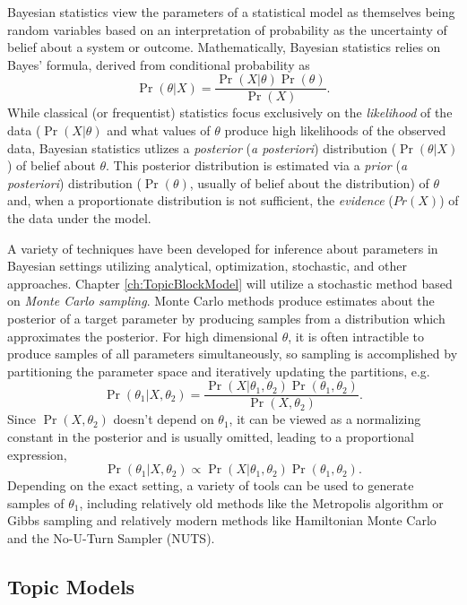         Bayesian statistics view the parameters of a statistical model as themselves being random variables based on an interpretation of probability as the uncertainty of belief about a system or outcome.  Mathematically, Bayesian statistics relies on Bayes' formula, derived from conditional probability as
        $$ \Pr(\theta | X) = \frac{\Pr(X | \theta) \Pr(\theta)}{\Pr(X)}. $$
        While classical (or frequentist) statistics focus exclusively on the \emph{likelihood} of the data ($\Pr(X | \theta)$ and what values of $\theta$ produce high likelihoods of the observed data, Bayesian statistics utlizes a \emph{posterior} (\emph{a posteriori}) distribution ($\Pr(\theta | X)$) of belief about $\theta$.  This posterior distribution is estimated via a \emph{prior} (\emph{a posteriori}) distribution ($\Pr(\theta)$, usually of belief about the distribution) of $\theta$ and, when a proportionate distribution is not sufficient, the \emph{evidence} ($Pr(X)$) of the data under the model.
        
        A variety of techniques have been developed for inference about parameters in Bayesian settings utilizing analytical, optimization, stochastic, and other approaches.  Chapter \ref{ch:TopicBlockModel} will utilize a stochastic method based on \emph{Monte Carlo sampling}.  Monte Carlo methods produce estimates about the posterior of a target parameter by producing samples from a distribution which approximates the posterior.  For high dimensional $\theta$, it is often intractible to produce samples of all parameters simultaneously, so sampling is accomplished by partitioning the parameter space and iteratively updating the partitions, e.g.
        $$ \Pr(\theta_1 | X, \theta_2) = \frac{\Pr(X | \theta_1, \theta_2) \Pr(\theta_1, \theta_2)}{\Pr(X, \theta_2)}. $$
        Since $\Pr(X, \theta_2)$ doesn't depend on $\theta_1$, it can be viewed as a normalizing constant in the posterior and is usually omitted, leading to a proportional expression,
        $$ \Pr(\theta_1 | X, \theta_2) \propto \Pr(X | \theta_1, \theta_2) \Pr(\theta_1, \theta_2).$$
        Depending on the exact setting, a variety of tools can be used to generate samples of $\theta_1$, including relatively old methods like the Metropolis\cite{metropolis1953equation} algorithm or Gibbs sampling\cite{geman1984stochastic} and relatively modern methods like Hamiltonian Monte Carlo\cite{girolami2011riemann} and the No-U-Turn Sampler (NUTS)\cite{hoffman2014no}.

    \subsection{Topic Models}  \label{sec:intro_topics}
    
